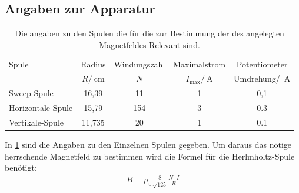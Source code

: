 \newpage
\subsection{Angaben zur Apparatur}
\begin{table}[h!]
	\centering
	\begin{tabular}{l c c c c}
	\toprule
	Spule & Radius & Windungszahl & Maximalstrom & Potentiometer\\
	& $R/\SI{}{\centi\meter}$ & $N$ & $I_\text{max}/\SI{}{\ampere}$ & Umdrehung/\SI{}{\ampere}\\\midrule
	Sweep-Spule & 16,39 & 11 & 1 & 0,1\\
	Horizontale-Spule & 15,79 & 154 & 3 & 0.3\\
	Vertikale-Spule & 11,735 & 20 & 1 & 0.1\\
	\bottomrule
	\end{tabular}
	\caption{Die angaben zu den Spulen die für die zur Bestimmung der des angelegten Magnetfeldes Relevant sind.\cite{V21}}\label{tab:Apparatur}
\end{table}
In \cref{tab:Apparatur} sind die Angaben zu den Einzelnen Spulen gegeben.
Um daraus das nötige herrschende Magnetfeld zu bestimmen wird die Formel für die Herlmholtz-Spule benötigt:
\begin{align}
	B=\mu_0\frac{8}{\sqrt{125}}\frac{N\cdot I}{R}
	\label{eq:helmholz_magnetfeld}
\end{align}